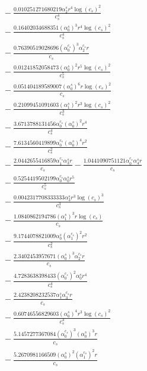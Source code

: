 \documentclass[10pt]{article}
\begin{document}
\begin{align*}
&{}  - \frac{0.010251271680219 \alpha_{2}^s r^{4} \log{\left(c_{s} \right)}^{2}}{c_{s}^{4}} \\
&{}  - \frac{0.16402034688351 \left(\alpha_{0}^s\right)^{3} r^{4} \log{\left(c_{s} \right)}^{2}}{c_{s}^{4}} \\
&{}  - \frac{0.76390519028696 \left(\alpha_{0}^{c_s}\right)^{3} \alpha_{2}^{c_s} r}{c_{s}} \\
&{}  - \frac{0.01241852058473 \left(\alpha_{0}^s\right)^{2} r^{5} \log{\left(c_{s} \right)}^{2}}{c_{s}^{5}} \\
&{}  - \frac{0.051404189589007 \left(\alpha_{0}^s\right)^{6} r \log{\left(c_{s} \right)}^{2}}{c_{s}} \\
&{}  - \frac{0.21099451091603 \left(\alpha_{1}^s\right)^{2} r^{3} \log{\left(c_{s} \right)}^{2}}{c_{s}^{3}} \\
&{}  - \frac{3.6713788131456 \alpha_{0}^{c_s} \left(\alpha_{0}^s\right)^{2} r^{4}}{c_{s}^{4}} \\
&{}  - \frac{7.6134560419899 \alpha_{0}^{c_s} \left(\alpha_{0}^s\right)^{4} r^{2}}{c_{s}^{2}} \\
&{}  - \frac{2.0442655416859 \alpha_{1}^{c_s} \alpha_{3}^s r}{c_{s}} - \frac{1.0441090751121 \alpha_{0}^{c_s} \alpha_{4}^s r}{c_{s}} \\
&{}  - \frac{0.5254419502199 \alpha_{0}^{c_s} \alpha_{0}^s r^{5}}{c_{s}^{5}} \\
&{}  - \frac{0.0042317708333333 \alpha_{3}^s r^{3} \log{\left(c_{s} \right)}^{3}}{c_{s}^{3}} \\
&{}  - \frac{1.0840862194786 \left(\alpha_{1}^s\right)^{3} r \log{\left(c_{s} \right)}}{c_{s}} \\
&{}  - \frac{9.1744078821009 \alpha_{0}^s \left(\alpha_{1}^{c_s}\right)^{2} r^{2}}{c_{s}^{2}} \\
&{}  - \frac{2.3402453957671 \left(\alpha_{0}^s\right)^{3} \alpha_{2}^{c_s} r}{c_{s}} \\
&{}  - \frac{4.7283638398433 \left(\alpha_{0}^{c_s}\right)^{2} \alpha_{0}^s r^{4}}{c_{s}^{4}} \\
&{}  - \frac{2.4238208232537 \alpha_{1}^s \alpha_{3}^{c_s} r}{c_{s}} \\
&{}  - \frac{0.60746556829603 \left(\alpha_{0}^s\right)^{4} r^{3} \log{\left(c_{s} \right)}^{2}}{c_{s}^{3}} \\
&{}  - \frac{5.1457277367084 \left(\alpha_{0}^{c_s}\right)^{3} \left(\alpha_{0}^s\right)^{3} r}{c_{s}} \\
&{}  - \frac{5.2670981166509 \left(\alpha_{0}^s\right)^{2} \left(\alpha_{1}^{c_s}\right)^{2} r}{c_{s}} \\

\end{align*}
\end{document}
